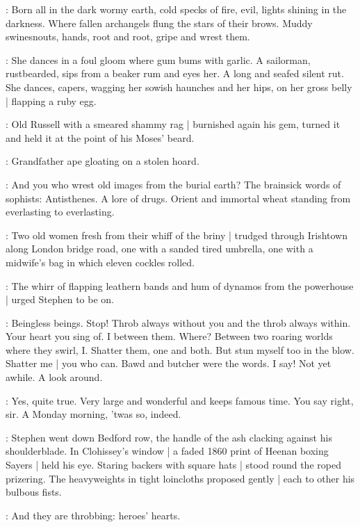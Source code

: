 \StephenInt:
Born all in the dark wormy earth,
cold specks of fire,
evil, lights shining in the darkness.
Where fallen archangels flung the stars of their brows.
Muddy swinesnouts,
hands,
root and root,
gripe and wrest them.

\StephenInt:
She dances in a foul gloom where gum bums with garlic.
A sailorman, rustbearded, sips from a beaker rum and eyes her.
A long and seafed silent rut.%
She dances, capers,
wagging her sowish haunches and her hips,
on her gross belly |
flapping a ruby egg.

:
Old Russell with a smeared shammy rag |
burnished again his gem,
turned it
and held it at the point of his Moses' beard.

\StephenInt:
Grandfather ape gloating on a stolen hoard.

\StephenInt:
And you who wrest old images from the burial earth?
The brainsick words of sophists:
Antisthenes.
A lore of drugs.
Orient and immortal wheat
standing from everlasting to everlasting.

\begin{interject}
    :
    Two old women
    fresh from their whiff of the briny |
    trudged through Irishtown along London bridge road,
    one with a sanded tired umbrella,
    one with a midwife's bag
    in which eleven cockles rolled.
\end{interject}%

:
The whirr of flapping leathern bands
and hum of dynamos from the powerhouse |
urged Stephen to be on.

\StephenInt:
Beingless beings.
Stop!
Throb always without you
and the throb always within.
Your heart you sing of.
I between them.
Where?
Between two roaring worlds where they swirl, I\@.
Shatter them, one and both.
But stun myself too in the blow.
Shatter me |
you who can.
Bawd and butcher were the words.
I say!
Not yet awhile.
A look around.

\russell:
Yes, quite true.
Very large and wonderful and keeps famous time.
You say right, sir.
A Monday morning, 'twas so, indeed.

:
Stephen went down Bedford row,%
the handle of the ash
clacking against his shoulderblade.
In Clohissey's window |
a faded 1860 print of Heenan boxing Sayers |
held his eye.
Staring backers with square hats |
stood round the roped prizering.
The heavyweights in tight loincloths proposed gently |
each to other his bulbous fists.

\StephenInt:
And they are throbbing:
heroes' hearts.

